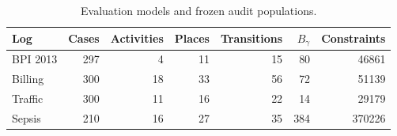 \begin{table}[t]\centering\small
\caption{Evaluation models and frozen audit populations.}
\begin{tabular}{lrrrrrr}\toprule
Log & Cases & Activities & Places & Transitions & $B_\gamma$ & Constraints\\\midrule
BPI 2013 & 297 & 4 & 11 & 15 & 80 & 46861\\
Billing & 300 & 18 & 33 & 56 & 72 & 51139\\
Traffic & 300 & 11 & 16 & 22 & 14 & 29179\\
Sepsis & 210 & 16 & 27 & 35 & 384 & 370226\\
\bottomrule\end{tabular}\end{table}
